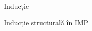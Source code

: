 \documentclass[xcolor=pdftex,romanian,colorlinks]{beamer}
\begin{document}
\begin{section}{Inducție}
\begin{subsection}{Inducție structurală în IMP}
\end{subsection}
%


\end{section}
\end{document}
